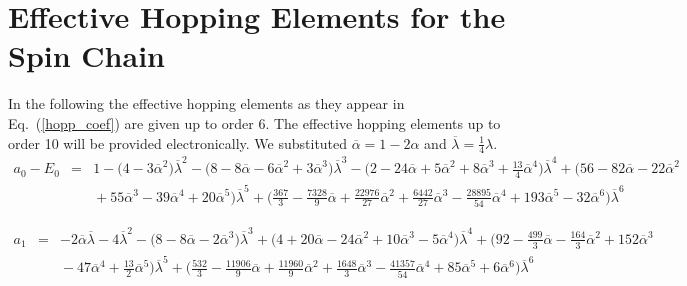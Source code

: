 \section{Effective Hopping Elements for the Spin Chain}
\label{app-effhopp}
In the following the effective hopping elements as they
appear in Eq.~(\ref{hopp_coef}) are given up to order 6. 
The effective hopping elements up to order 10  will be provided electronically.
We substituted $\overline{\alpha} = 1 - 2\alpha$ and 
$\overline{\lambda} = \frac{1}{4}\lambda$.
\begin{eqnarray*}
a_0-E_0 &=& 1-\bigg(4-3\overline{\alpha}^{2}\bigg)\overline{\lambda}^{2} 
- \bigg(8-8\overline{\alpha} -
6\overline{\alpha}^{2} + 3\overline{\alpha}^{
3}\bigg)\overline{\lambda} ^{3} 
-\bigg(2 - 24\overline{\alpha} +
5\overline{\alpha}^{2} + 8\overline{\alpha}^{3} + {\displaystyle
\frac {13}{4}} \overline{\alpha}^{4} \bigg)\overline{\lambda} ^{4}
 + \bigg(56 - 82\overline{\alpha} - 22\overline{\alpha}^{2}
\\
& & \mbox{}  + 55\overline{\alpha}^{3} - 39\overline{\alpha}^{4} + 20
\overline{\alpha}^{5}\bigg)\overline{\lambda} ^{5}
 + \bigg( {\displaystyle 
\frac {367}{3}} - {\displaystyle \frac {7328}{9}} \overline{\alpha} +
{\displaystyle \frac {22976}{27}} \overline{\alpha}^{2} + {\displaystyle 
\frac {6442}{27}} \overline{\alpha}^{3} -{\displaystyle \frac {28895}{54}} 
\overline{\alpha}^{4} + 193\overline{\alpha}^{5} - 32\overline{\alpha}^{6}
 \bigg)\overline{\lambda} ^{6} 
\end{eqnarray*}

\begin{eqnarray*}
a_1 &=& - 2\overline{\alpha}\overline{\lambda}  - 
4\overline{\lambda} ^{2} - \bigg(8-8\overline{\alpha} - 2\overline{\alpha}^{3}
\bigg)\overline{\lambda} ^{3} + \bigg(4+20\overline{\alpha} - 
24\overline{\alpha}^{2} + 10\overline{\alpha}^{3} - 5\overline{\alpha}^{4}
 \bigg)\overline{\lambda} ^{4} 
+\bigg(92- {\displaystyle \frac {499}{3}} \overline{\alpha} -
{\displaystyle \frac {164}{3}} \overline{\alpha}^{2} + 
152\overline{\alpha}^{3}
\\
& & \mbox{} 
 - 47\overline{\alpha}^{4}
 + {\displaystyle \frac {13}{2}} \overline{\alpha}^{5}
\bigg)\overline{\lambda} ^{5}
+ \bigg( {\displaystyle 
\frac {532}{3}} - {\displaystyle \frac {11906}{9}} \overline{\alpha} + 
{\displaystyle \frac {11960}{9}} \overline{\alpha}^{2} + {\displaystyle \frac {
1648}{3}} \overline{\alpha}^{3} - {\displaystyle \frac {41357}{54}} 
\overline{\alpha}^{4} +
85\overline{\alpha}^{5} + 6\overline{\alpha}^{6}\bigg)\overline{\lambda} 
^{6}
\end{eqnarray*}



